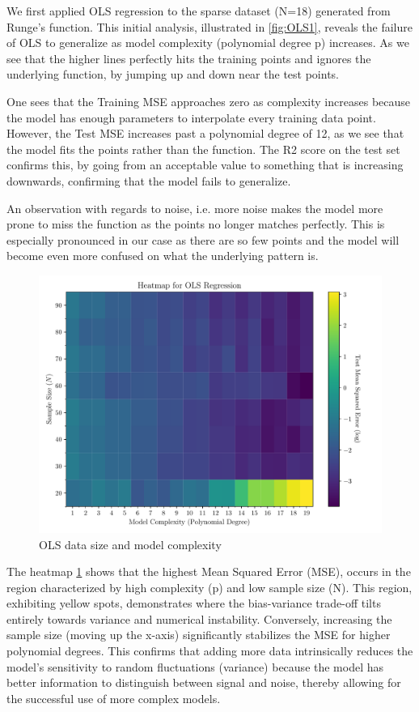 \documentclass[twocolumn,aps]{revtex4}
\begin{document}
We first applied OLS regression to the sparse dataset (N=18) generated from Runge’s function. 
This initial analysis, illustrated in \ref{fig:OLS1}, reveals the failure of OLS to generalize as model complexity (polynomial degree p) increases. 
As we see that the higher lines perfectly hits the training points and ignores the underlying function, by jumping up and down near the test points.

One sees that the Training MSE approaches zero as complexity increases because the model has enough parameters to interpolate every training data point. 
However, the Test MSE increases past a polynomial degree of 12, as we see that the model fits the points rather than the function.
The R2 score on the test set confirms this, by going from an acceptable value to something that is increasing downwards, confirming that the model fails to generalize.

An observation with regards to noise, i.e. more noise makes the model more prone to miss the function as the points no longer matches perfectly. This is especially pronounced in our case as there are so few points and the model will become even more confused on what the underlying pattern is.
\begin{figure}[H]
    \centering
    \includegraphics[width=.95 \linewidth]{Figures/OLS_Heatmap.pdf}
    \caption{OLS data size and model complexity}
    \label{fig:OLSHeat}
\end{figure}


The heatmap \ref{fig:OLSHeat} shows that the highest Mean Squared Error (MSE), occurs in the region characterized by high complexity (p) and low sample size (N). 
This region, exhibiting yellow spots, demonstrates where the bias-variance trade-off tilts entirely towards variance and numerical instability. 
Conversely, increasing the sample size (moving up the x-axis) significantly stabilizes the MSE for higher polynomial degrees. 
This confirms that adding more data intrinsically reduces the model's sensitivity to random fluctuations (variance) because the model has better information to distinguish between signal and noise, thereby allowing for the successful use of more complex models.
\end{document}
